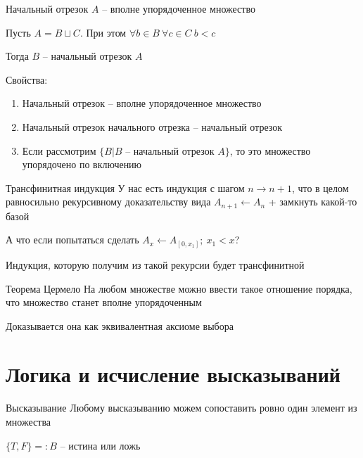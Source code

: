 \documentclass[12pt]{article}
\begin{document}
\begin{defin}{Начальный отрезок}
    $A$ -- вполне упорядоченное множество

    Пусть $A = B \sqcup C$. При этом $\forall b \in B\ \forall c \in C\ b < c$

    Тогда $B$ -- начальный отрезок $A$
\end{defin}

\begin{nota}{Свойства:}
    \begin{enumerate}
        \item Начальный отрезок -- вполне упорядоченное множество
        \item Начальный отрезок начального отрезка -- начальный отрезок
        \item Если рассмотрим $\{B | B \text{ -- начальный отрезок } A\}$, то это множество упорядочено по включению
    \end{enumerate}
\end{nota}

\begin{defin}{Трансфинитная индукция}
    У нас есть индукция с шагом $n \to n + 1$, что в целом равносильно рекурсивному доказательству вида $A_{n + 1} \leftarrow A_n$ + замкнуть какой-то базой

    А что если попытаться сделать $A_x \leftarrow A_{[0, x_1]};\ x_1 < x$?

    Индукция, которую получим из такой рекурсии будет трансфинитной 
\end{defin}

\begin{theo}{Теорема Цермело}
    На любом множестве можно ввести такое отношение порядка, что множество станет вполне упорядоченным
\end{theo}

\begin{Remark}{}
    Доказывается она как эквивалентная аксиоме выбора
\end{Remark}

\section{Логика и исчисление высказываний}

\begin{defin}{Высказывание}
    Любому высказыванию можем сопоставить ровно один элемент из множества 
    
    $\{T, F\} =: B$ -- истина или ложь
\end{defin}
\end{document}
